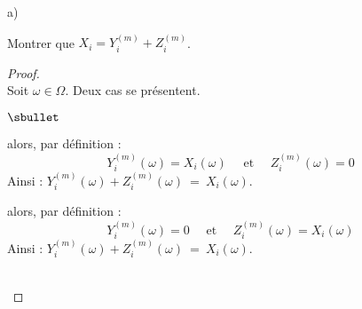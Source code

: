 \documentclass[11pt]{article}%
\begin{document}
\begin{liste}{a)}
  \setlength{\itemsep}{2mm}
\item Montrer que $X_{i} = Y_{i}^{(m)} + Z_{i}^{(m)}$.
  
  \begin{proof}~\\%
    Soit $\omega \in \Omega$. Deux cas se présentent.
    \begin{noliste}{$\sbullet$}
    \item {} alors, par définition :
      \[
      Y_{i}^{(m)}(\omega) = X_i(\omega) \quad \text{ et } \quad
      Z_{i}^{(m)}(\omega) = 0
      \]
      Ainsi : $Y_{i}^{(m)}(\omega) + Z_{i}^{(m)}(\omega) \ = \
      X_i(\omega)$.




    \item {} alors, par définition :
      \[
      Y_{i}^{(m)}(\omega) = 0 \quad \text{ et } \quad Z_{i}^{(m)}(\omega) =
      X_i(\omega)
      \]
      Ainsi : $Y_{i}^{(m)}(\omega) + Z_{i}^{(m)}(\omega) \ = \
      X_i(\omega)$.
    \end{noliste}
    ~\\[-1.4cm]
  \end{proof}

\item ~\\[-1.15cm]
\end{liste}
\end{document}
